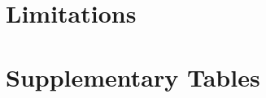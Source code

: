 \documentclass{article}
\begin{document}
\section{Limitations}

\begin{ack}
\end{ack}


{\small


}



\appendix


\renewcommand{\tablename}{Supplementary Table}
\renewcommand{\figurename}{Supplementary Figure}

\newpage
\section{Supplementary Tables}





\end{document}
